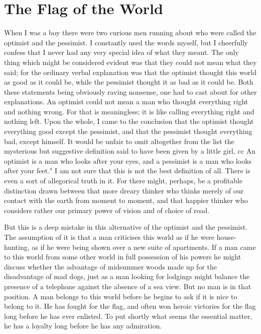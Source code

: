 \documentclass{book}
\begin{document}
\chapter{The Flag of the World}
\label{chapter-4}
When I was a boy there were two curious men running about who were called the optimist and the pessimist. I constantly used the words myself, but I cheerfully confess that I never had any very special idea of what they meant. The only thing which might be considered evident was that they could not mean what they said; for the ordinary verbal explanation was that the optimist thought this world as good as it could be, while the pessimist thought it as bad as it could be. Both these statements being obviously raving nonsense, one had to cast about for other explanations. An optimist could not mean a man who thought everything right and nothing wrong. For that is meaningless; it is like calling everything right and nothing left. Upon the whole, I came to the conclusion that the optimist thought everything good except the pessimist, and that the pessimist thought everything bad, except himself. It would be unfair to omit altogether from the list the mysterious but suggestive definition said to have been given by a little girl, cc An optimist is a man who looks after your eyes, and a pessimist is a man who looks after your feet." I am not sure that this is not the best definition of all. There is even a sort of allegorical truth in it. For there might, perhaps, be a profitable distinction drawn between that more dreary thinker who thinks merely of our contact with the earth from moment to moment, and that happier thinker who considers rather our primary power of vision and of choice of road.

But this is a deep mistake in this alternative of the optimist and the pessimist. The assumption of it is that a man criticises this world as if he were house-hunting, as if he were being shown over a new suite of apartments. If a man came to this world from some other world in full possession of his powers he might discuss whether the advantage of midsummer woods made up for the disadvantage of mad dogs, just as a man looking for lodgings might balance the presence of a telephone against the absence of a sea view. But no man is in that position. A man belongs to this world before he begins to ask if it is nice to belong to it. He has fought for the flag, and often won heroic victories for the flag long before he has ever enlisted. To put shortly what seems the essential matter, he has a loyalty long before he has any admiration.
\end{document}
